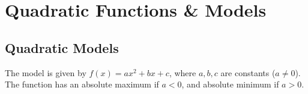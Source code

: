 \documentclass[notes]{subfiles}
\begin{document}
	\fancyhead[LO,RE]{\bfseries \currentname}
	\fancyfoot[C]{{}}
	\fancyfoot[RO,LE]{\large \thepage}	%


\section*{Quadratic Functions \& Models}\label{cs19}
	\subsection*{Quadratic Models}
		The model is given by $f(x) = ax^2 + bx + c$, where $a,b,c$ are constants ($a\neq 0$).  The function has an absolute maximum if $a < 0$, and absolute minimum if $a > 0$.
\end{document}
